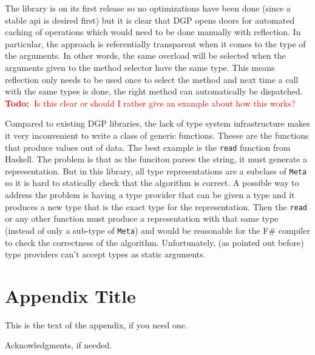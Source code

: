 \documentclass{sigplanconf}
\newcommand{\todo}[1]{
\ifthenelse
  {\boolean{showNotes}}
  {\textcolor{red}{\textbf{Todo:~}#1}}
  {}}
\begin{document}
The library is on its first release so no optimizations have
been done (since a stable api is desired first) but it is
clear that DGP opens doors for automated caching of operations
which would need to be done manually with reflection. In particular,
the approach is referentially transparent when it comes to the type
of the arguments. In other words, the same overload will be selected
when the arguments given to the method selector have the same type.
This means reflection only needs to be used once to select the
method and next time a call with the same types is done, the
right method can automatically be dispatched. \todo{Is this
clear or should I rather give an example about how this works?}

Compared to existing DGP libraries, the lack of type system
infrastructure makes it very inconvenient to write a class
of generic functions. Theese are the functions that produce
values out of data. The best example is the \verb+read+ function
from Haskell. The problem is that as the funciton parses the
string, it must generate a representation. But in this library,
all type representations are a subclass of \verb+Meta+ so it is
hard to statically check that the algorithm is correct. A
possible way to address the problem is having a type provider
that can be given a type and it produces a new type that
is the exact type for the representation. Then the \verb+read+
or any other function must produce a representation with
that same type (instead of only a sub-type of \verb+Meta+) and
would be reasonable for the F\# compiler to check the correctness
of the algorithm. Unfortunately, (as pointed out before) type
providers can't accept types as static arguments.



\appendix


\section{Appendix Title}

This is the text of the appendix, if you need one.

\acks

Acknowledgments, if needed.



\end{document}
